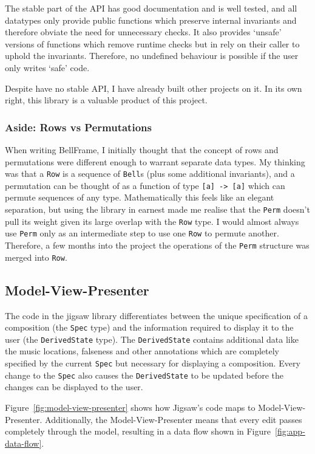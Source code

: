 \documentclass[12pt]{article}
\begin{document}
The stable part of the API has good documentation and is well tested, and all datatypes only provide
public functions which preserve internal invariants and therefore obviate the need for unnecessary
checks.  It also provides `unsafe' versions of functions which remove runtime checks but in rely on
their caller to uphold the invariants.  Therefore, no undefined behaviour is possible if the user
only writes `safe' code.

Despite have no stable API, I have already built other projects on it.  In its own right, this
library is a valuable product of this project.

\subsubsection{Aside: Rows vs Permutations}

When writing BellFrame, I initially thought that the concept of rows and permutations were different
enough to warrant separate data types.  My thinking was that a \verb|Row| is a sequence of
\verb|Bell|s (plus some additional invariants), and a permutation can be thought of as a function of
type \verb|[a] -> [a]| which can permute sequences of any type.  Mathematically this feels like an
elegant separation, but using the library in earnest made me realise that the \verb|Perm| doesn't
pull its weight given its large overlap with the \verb|Row| type.  I would almost always use
\verb|Perm| only as an intermediate step to use one \verb|Row| to permute another.  Therefore, a few
months into the project the operations of the \verb|Perm| structure was merged into \verb|Row|.

\subsection{Model-View-Presenter}

The code in the jigsaw library differentiates between the unique specification of a composition
(the \verb|Spec| type) and the information required to display it to the user (the
\verb|DerivedState| type).  The \verb|DerivedState| contains additional data like the music
locations, falseness and other annotations which are completely specified by the current
\verb|Spec| but necessary for displaying a composition.  Every change to the \verb|Spec| also causes
the \verb|DerivedState| to be updated before the changes can be displayed to the user.

Figure~\ref{fig:model-view-presenter} shows how Jigsaw's code maps to Model-View-Presenter.
Additionally, the Model-View-Presenter means that every edit passes completely through the model,
resulting in a data flow shown in Figure~\ref{fig:app-data-flow}.
\end{document}
